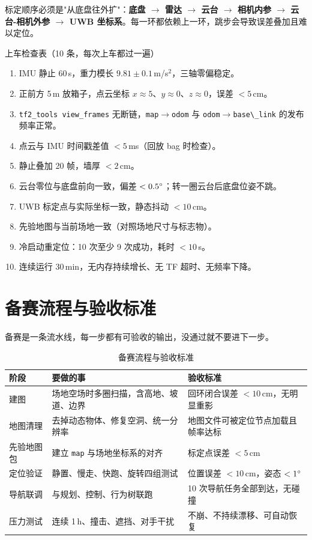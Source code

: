 标定顺序必须是"从底盘往外扩"：\textbf{底盘 $\to$ 雷达 $\to$ 云台 $\to$ 相机内参 $\to$ 云台-相机外参 $\to$ UWB 坐标系}。每一环都依赖上一环，跳步会导致误差叠加且难以定位。

\begin{keybox}{上车检查表（10 条，每次上车都过一遍）}
\begin{enumerate}
  \item IMU 静止 60\,s，重力模长 $9.81\pm0.1$\,m/s$^2$，三轴零偏稳定。
  \item 正前方 5\,m 放箱子，点云坐标 $x\approx5$、$y\approx0$、$z\approx0$，误差 $<5$\,cm。
  \item \lstinline{tf2_tools view_frames} 无断链，\lstinline{map}$\to$\lstinline{odom} 与 \lstinline{odom}$\to$\lstinline{base\_link} 的发布频率正常。
  \item 点云与 IMU 时间戳差值 $<5$\,ms（回放 bag 时检查）。
  \item 静止叠加 20 帧，墙厚 $<2$\,cm。
  \item 云台零位与底盘前向一致，偏差 $<0.5^\circ$；转一圈云台后底盘位姿不跳。
  \item UWB 标定点与实际坐标一致，静态抖动 $<10$\,cm。
  \item 先验地图与当前场地一致（对照场地尺寸与标志物）。
  \item 冷启动重定位：10 次至少 9 次成功，耗时 $<10$\,s。
  \item 连续运行 30\,min，无内存持续增长、无 TF 超时、无频率下降。
\end{enumerate}
\end{keybox}

\section{备赛流程与验收标准}\label{sec:29-process}

备赛是一条流水线，每一步都有可验收的输出，没通过就不要进下一步。

\begin{table}[htbp]
  \centering
  \caption{备赛流程与验收标准}\label{tab:29-process}
  \footnotesize
  \begin{tabular}{p{2.4cm}p{5.6cm}p{5.6cm}}
    \toprule
    阶段 & 要做的事 & 验收标准 \\
    \midrule
    建图 & 场地空场时多圈扫描，含高地、坡道、边界 & 回环闭合误差 $<10$\,cm，无明显重影 \\
    地图清理 & 去掉动态物体、修复空洞、统一分辨率 & 地图文件可被定位节点加载且帧率达标 \\
    先验地图包 & 建立 \lstinline{map} 与场地坐标系的对齐 & 标定点误差 $<5$\,cm \\
    定位验证 & 静置、慢走、快跑、旋转四组测试 & 位置误差 $<10$\,cm，姿态 $<1^\circ$ \\
    导航联调 & 与规划、控制、行为树联跑 & 10 次导航任务全部到达，无碰撞 \\
    压力测试 & 连续 1\,h、撞击、遮挡、对手干扰 & 不崩、不持续漂移、可自动恢复 \\
    \bottomrule
  \end{tabular}
\end{table}

